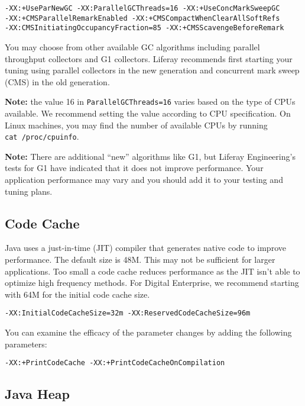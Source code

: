 \begin{verbatim}
-XX:+UseParNewGC -XX:ParallelGCThreads=16 -XX:+UseConcMarkSweepGC
-XX:+CMSParallelRemarkEnabled -XX:+CMSCompactWhenClearAllSoftRefs
-XX:CMSInitiatingOccupancyFraction=85 -XX:+CMSScavengeBeforeRemark
\end{verbatim}

You may choose from other available GC algorithms including parallel
throughput collectors and G1 collectors. Liferay recommends first
starting your tuning using parallel collectors in the new generation and
concurrent mark sweep (CMS) in the old generation.

\textbf{Note:} the value 16 in \texttt{ParallelGCThreads=16} varies
based on the type of CPUs available. We recommend setting the value
according to CPU specification. On Linux machines, you may find the
number of available CPUs by running \texttt{cat\ /proc/cpuinfo}.

\textbf{Note:} There are additional ``new'' algorithms like G1, but
Liferay Engineering's tests for G1 have indicated that it does not
improve performance. Your application performance may vary and you
should add it to your testing and tuning plans.

\subsection{Code Cache}\label{code-cache}

Java uses a just-in-time (JIT) compiler that generates native code to
improve performance. The default size is 48M. This may not be sufficient
for larger applications. Too small a code cache reduces performance as
the JIT isn't able to optimize high frequency methods. For Digital
Enterprise, we recommend starting with 64M for the initial code cache
size.

\begin{verbatim}
-XX:InitialCodeCacheSize=32m -XX:ReservedCodeCacheSize=96m
\end{verbatim}

You can examine the efficacy of the parameter changes by adding the
following parameters:

\begin{verbatim}
-XX:+PrintCodeCache -XX:+PrintCodeCacheOnCompilation
\end{verbatim}

\subsection{Java Heap}\label{java-heap}

